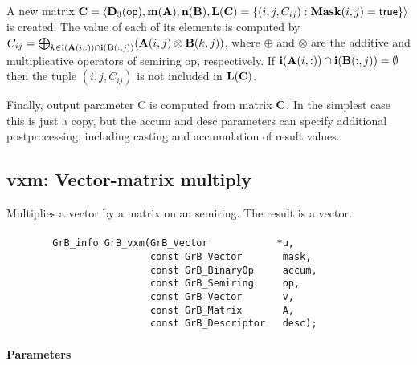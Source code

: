 A new matrix ${\bf C} = \langle \bold{D}_3({\sf op}),
\bold{m}({\bf A}), \bold{n}({\bf B}), \bold{L}({\bf C}) = \{(i,j,C_{ij}) : {\bf Mask}(i,j)
= {\sf true} \} \rangle$ is created.  The value of each of its elements
is computed by $C_{ij} = \bigoplus_{k \in {\bf i}({\bf A}(i,:)) \cap
{\bf i}({\bf B}(:,j))} ({\bf A}(i,j) \otimes {\bf B}(k,j))$,
where $\oplus$ and $\otimes$ are the additive and multiplicative
operators of semiring {\sf op}, respectively.  If ${\bf i}({\bf A}(i,:)) \cap {\bf i}({\bf B}(:,j)) = \emptyset $ then the tuple $(i,j,C_{ij})$
is not included in $\bold{L}({\bf C})$.

Finally, output parameter {\sf C} is computed from matrix ${\bf C}$. In the 
simplest case this is just a copy, but the {\sf accum} and {\sf desc} parameters can
specify additional postprocessing, including casting and accumulation of result
values.



\subsection{{\sf vxm}: Vector-matrix multiply}

Multiplies a vector by a matrix on an semiring. The result is a vector.

\paragraph{\syntax}

\begin{verbatim}
        GrB_info GrB_vxm(GrB_Vector            *u,
                         const GrB_Vector       mask,
                         const GrB_BinaryOp     accum,
                         const GrB_Semiring     op,
                         const GrB_Vector       v, 
                         const GrB_Matrix       A,
                         const GrB_Descriptor   desc);
\end{verbatim}

\paragraph{Parameters}

